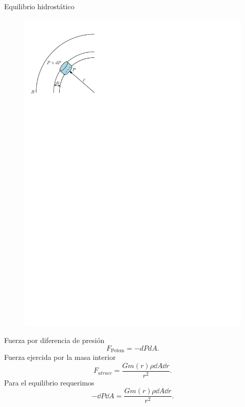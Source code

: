 \documentclass[11pt]{beamer}
\begin{document}
\begin{frame}{Equilibrio hidrostático}
    \begin{figure}
        \centering
        \includegraphics[width=\linewidth]{stellarnewton.pdf}
    \end{figure}
    Fuerza por diferencia de presión
    \begin{equation*}
        F _ { \text{Pelem} } = - d P d A.
    \end{equation*}
    Fuerza ejercida por la masa interior
    \begin{equation*}
        F_{atracc}=\frac{G m(r)\rho \dd{A} \dd{r}}{r^2}.
    \end{equation*}
    Para el equilibrio requerimos
    \begin{equation}
        -\dd{P}\dd{A} =\frac{G m(r)\rho \dd{A} \dd{r}}{r^2}.
    \end{equation}
\end{frame}
\end{document}
